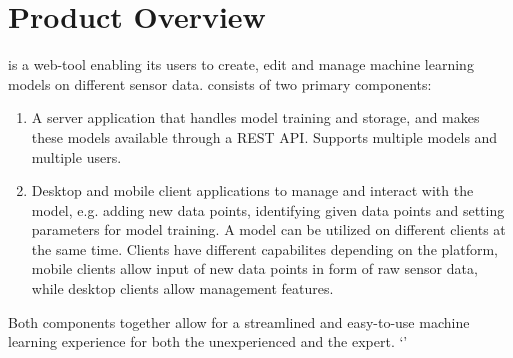 \section{Product Overview}

 {\pseProjectName} is a web-tool enabling its users to create, edit and manage machine learning models on different sensor data. {\pseProjectName} consists of two primary components:

\begin{enumerate}
    \item A server application that handles model training and storage, and makes these models available through a REST API. Supports multiple models and multiple users.
    \item Desktop and mobile client applications to manage and interact with the model, e.g. adding new data points, identifying given data points and setting parameters for model training. A model can be utilized on different clients at the same time. Clients have different capabilites depending on the platform, mobile clients allow input of new data points in form of raw sensor data, while desktop clients allow management features. %
\end{enumerate}

Both components together allow for a streamlined and easy-to-use machine learning experience for both the unexperienced and the expert.
`'